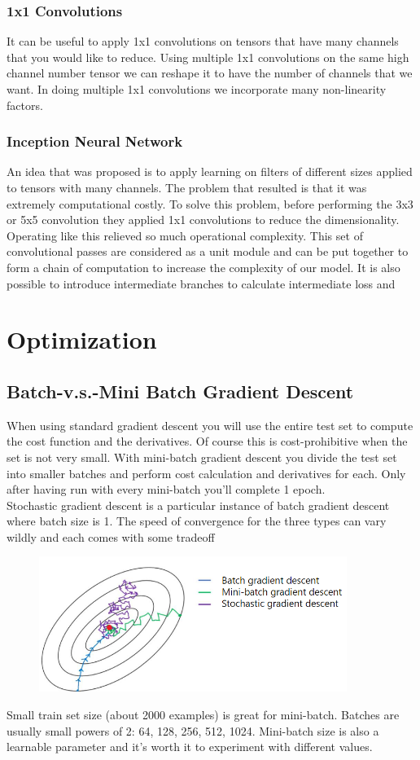 \documentclass{article}
\begin{document}
\subsubsection*{1x1 Convolutions}
It can be useful to apply 1x1 convolutions on tensors that have many channels that you would like to reduce. Using multiple 1x1 convolutions on the same high channel number tensor we can reshape it to have the number of channels that we want. In doing multiple 1x1 convolutions we incorporate many non-linearity factors.
\subsubsection*{Inception Neural Network}
An idea that was proposed is to apply learning on filters of different sizes applied to tensors with many channels. The problem that resulted is that it was extremely computational costly. To solve this problem, before performing the 3x3 or 5x5 convolution they applied 1x1 convolutions to reduce the dimensionality. Operating like this relieved so much operational complexity. This set of convolutional passes are considered as a unit module and can be put together to form a chain of computation to increase the complexity of our model. It is also possible to introduce intermediate branches to calculate intermediate loss and 


\section{Optimization}
\subsection*{Batch-v.s.-Mini Batch Gradient Descent}
When using standard gradient descent you will use the entire test set to compute the cost function and the derivatives. Of course this is cost-prohibitive when the set is not very small. With mini-batch gradient descent you divide the test set into smaller batches and perform cost calculation and derivatives for each. Only after having run with every mini-batch you'll complete 1 epoch.\\
Stochastic gradient descent is a particular instance of batch gradient descent where batch size is 1. The speed of convergence for the three types can vary wildly and each comes with some tradeoff
\begin{figure}[htbp]
    \centering
    \includegraphics[width=10cm]{descent-comparison.png}
\end{figure}
Small train set size (about 2000 examples) is great for mini-batch. Batches are usually small powers of 2: 64, 128, 256, 512, 1024. Mini-batch size is also a learnable parameter and it's worth it to experiment with different values.
\end{document}
